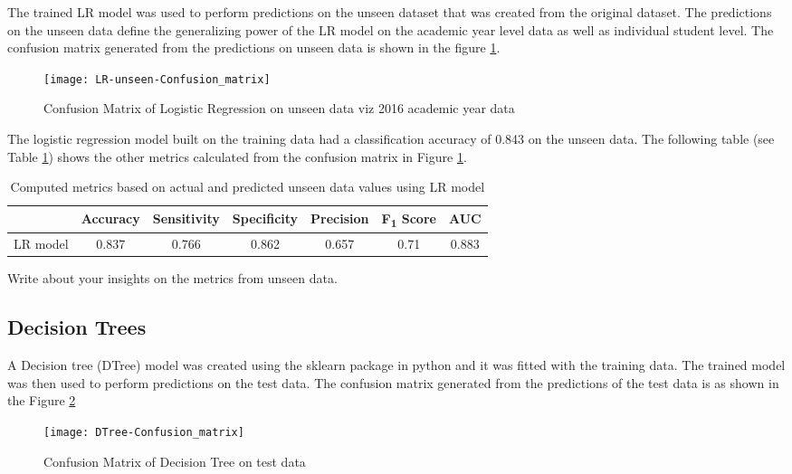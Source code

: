 \documentclass[11pt,openright]{report}
\begin{document}
The trained LR model was used to perform predictions on the unseen dataset that was created from the original dataset. The predictions on the unseen data define the generalizing power of the LR model on the academic year level data as well as individual student level. The confusion matrix generated from the predictions on unseen data is shown in the figure \ref{fig:lr_unseen_confusion_matrix}.

  \begin{figure}[!htbp]
	\centering
	\texttt{[image: LR-unseen-Confusion\_matrix]}
	\caption{Confusion Matrix of Logistic Regression on unseen data viz 2016 academic year data}
	\label{fig:lr_unseen_confusion_matrix}
\end{figure} 


The logistic regression model built on the training data had a classification accuracy of 0.843 on the unseen data. The following table (see Table \ref{table:lr-unseen_metrics_db}) shows the other metrics calculated from the confusion matrix in Figure \ref{fig:lr_unseen_confusion_matrix}.

\begin{table}[!htbp]
	\renewcommand{\arraystretch}{1.3}
	\caption{Computed metrics based on actual and predicted unseen data values using LR model}
	\label{table:lr-unseen_metrics_db}
	\centering
	\begin{tabular}{|c|c|c|c|c|c|c|}
    \hline
  	 & \bfseries Accuracy & \bfseries Sensitivity & \bfseries Specificity & \bfseries Precision & \bfseries F\textsubscript{1} Score  & \bfseries AUC\\  
    \hline
	LR model & 0.837 & 0.766 & 0.862 & 0.657 & 0.71 & 0.883 \\ \hline
	\end{tabular} 
\end{table}
Write about your insights on the metrics from unseen data.



\subsection {Decision Trees}
A Decision tree (DTree) model was created using the sklearn package in python and it was fitted with the training data. The trained model was then used to perform predictions on the test data. The confusion matrix generated from the predictions of the test data is as shown in the Figure \ref{fig:Dtree_confusion_matrix}

  \begin{figure}
	\centering
	\texttt{[image: DTree-Confusion\_matrix]}
	\caption{Confusion Matrix of Decision Tree on test data}
	\label{fig:Dtree_confusion_matrix}
\end{figure} 
\end{document}
